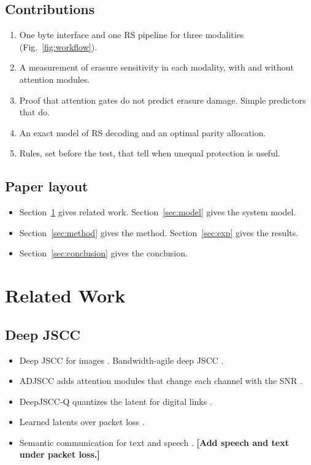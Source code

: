 \documentclass[journal]{IEEEtran}
\providecommand{\TBD}[1]{\textbf{\color{red}[#1]}}
\begin{document}
\subsection*{Contributions}
\begin{enumerate}
\item One byte interface and one RS pipeline for three modalities (Fig.~\ref{fig:workflow}).
\item A measurement of erasure sensitivity in each modality, with and without attention modules.
\item Proof that attention gates do not predict erasure damage. Simple predictors that do.
\item An exact model of RS decoding and an optimal parity allocation.
\item Rules, set before the test, that tell when unequal protection is useful.
\end{enumerate}
\subsection*{Paper layout}
\begin{itemize}
\item Section~\ref{sec:related} gives related work. Section~\ref{sec:model} gives the system model.
\item Section~\ref{sec:method} gives the method. Section~\ref{sec:exp} gives the results.
\item Section~\ref{sec:conclusion} gives the conclusion.
\end{itemize}

\section{Related Work}\label{sec:related}
\subsection{Deep JSCC}
\begin{itemize}
\item Deep JSCC for images \cite{bourtsoulatze2019deep}. Bandwidth-agile deep JSCC \cite{kurka2021bandwidth}.
\item ADJSCC adds attention modules that change each channel with the SNR \cite{xu2022adjscc}.
\item DeepJSCC-Q quantizes the latent for digital links \cite{tung2022deepjsccq}.
\item Learned latents over packet loss \cite{esfahanizadeh2026block,bo2026lgsemcom,wei2026everypacket}.
\item Semantic communication for text and speech \cite{xie2021deepsc,weng2021deepscs}. \TBD{Add speech and text under packet loss.}
\end{itemize}
\end{document}
